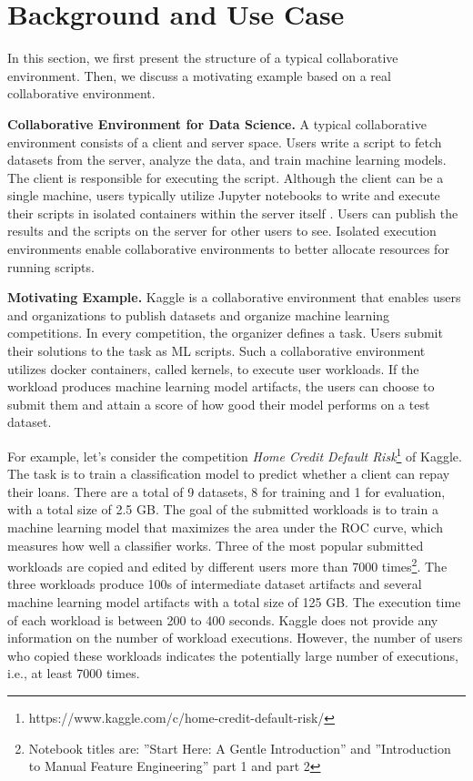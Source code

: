 \section{Background and Use Case} \label{sec-background}
In this section, we first present the structure of a typical collaborative environment.
Then, we discuss a motivating example based on a real collaborative environment.

\textbf{Collaborative Environment for Data Science.}
A typical collaborative environment consists of a client and server space.
Users write a script to fetch datasets from the server, analyze the data, and train machine learning models.
The client is responsible for executing the script.
Although the client can be a single machine, users typically utilize Jupyter notebooks  \cite{Kluyver:2016aa} to write and execute their scripts in isolated containers \cite{merkel2014docker} within the server itself \cite{kagglewebsite, googlecolab, netflix-notebook}.
Users can publish the results and the scripts on the server for other users to see.
Isolated execution environments enable collaborative environments to better allocate resources for running scripts.

\textbf{Motivating Example.}
Kaggle is a collaborative environment that enables users and organizations to publish datasets and organize machine learning competitions.
In every competition, the organizer defines a task.
Users submit their solutions to the task as ML scripts.
Such a collaborative environment utilizes docker containers, called kernels, to execute user workloads.
If the workload produces machine learning model artifacts, the users can choose to submit them and attain a score of how good their model performs on a test dataset.

For example, let's consider the competition \textit{Home Credit Default Risk}\footnote{https://www.kaggle.com/c/home-credit-default-risk/} of Kaggle.
The task is to train a classification model to predict whether a client can repay their loans.
There are a total of 9 datasets, 8 for training and 1 for evaluation, with a total size of 2.5 GB.
The goal of the submitted workloads is to train a machine learning model that maximizes the area under the ROC curve, which measures how well a classifier works.
Three of the most popular submitted workloads are copied and edited by different users more than 7000 times\footnote{Notebook titles are: ''Start Here: A Gentle Introduction'' and ''Introduction to Manual Feature Engineering'' part 1 and part 2}.
The three workloads produce 100s of intermediate dataset artifacts and several machine learning model artifacts with a total size of 125 GB.
The execution time of each workload is between 200 to 400 seconds.
Kaggle does not provide any information on the number of workload executions.
However, the number of users who copied these workloads indicates the potentially large number of executions, i.e., at least 7000 times.

